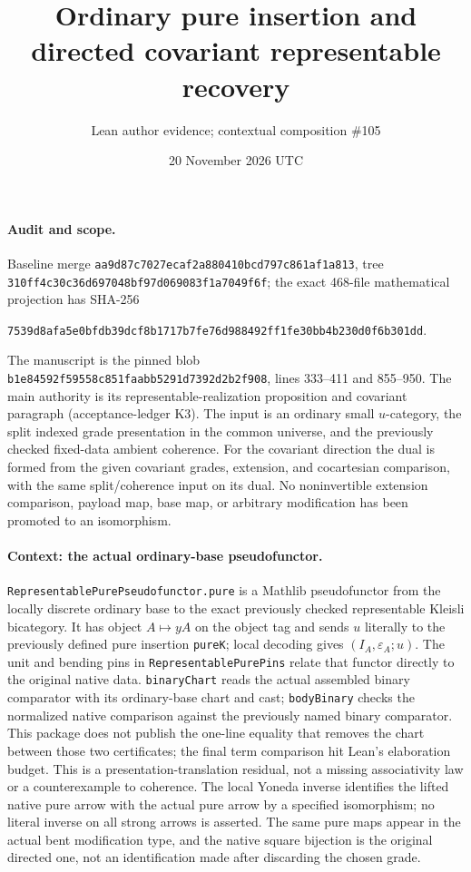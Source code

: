 \documentclass[11pt]{article}
\title{Ordinary pure insertion and directed covariant representable recovery}
\author{Lean author evidence; contextual composition \#105}
\date{20 November 2026 UTC}
\newcommand{\m}[1]{\texttt{#1}}
\begin{document}
\maketitle

\paragraph{Audit and scope.}
Baseline merge \m{aa9d87c7027ecaf2a880410bcd797c861af1a813}, tree
\m{310ff4c30c36d697048bf97d069083f1a7049f6f}; the exact 468-file mathematical
projection has SHA-256
\begin{center}\small\m{7539d8afa5e0bfdb39dcf8b1717b7fe76d988492ff1fe30bb4b230d0f6b301dd}.\end{center}
The manuscript is the pinned blob \m{b1e84592f59558c851faabb5291d7392d2b2f908},
lines 333--411 and 855--950. The main authority is its representable-realization
proposition and covariant paragraph (acceptance-ledger K3). The input is an
ordinary small $u$-category, the split indexed grade presentation in the common
universe, and the previously checked fixed-data ambient coherence.
For the covariant direction the dual is formed from the given covariant
grades, extension, and cocartesian comparison, with the same split/coherence
input on its dual. No noninvertible extension comparison, payload map,
base map, or arbitrary modification has been promoted to an isomorphism.

\paragraph{Context: the actual ordinary-base pseudofunctor.}
\m{RepresentablePurePseudofunctor.pure} is a Mathlib pseudofunctor from
the locally discrete ordinary base to the exact previously checked
representable Kleisli bicategory. It has object $A\mapsto yA$ on the object
tag and sends $u$ literally to the previously defined pure insertion
\m{pureK}; local decoding gives $(I_A,\varepsilon_A;u)$.
The unit and bending pins in \m{RepresentablePurePins} relate that functor
directly to the original native data. \m{binaryChart} reads the actual
assembled binary comparator with its ordinary-base chart and cast;
\m{bodyBinary} checks the normalized native comparison against the
previously named binary comparator. This package does not publish the
one-line equality that removes the chart between those two certificates;
the final term comparison hit Lean's elaboration budget. This is a
presentation-translation residual, not a missing associativity law or
a counterexample to coherence. The local Yoneda inverse
identifies the lifted native pure arrow with the actual pure arrow by a
specified isomorphism; no literal inverse on all strong arrows is asserted.
The same pure maps appear in the actual bent modification type, and the
native square bijection is the original directed one, not an identification
made after discarding the chosen grade.
\end{document}
